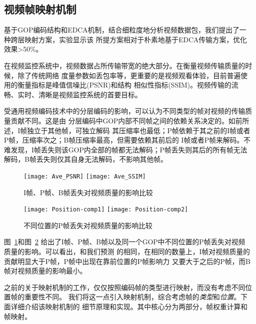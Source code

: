 \subsection{视频帧映射机制}
基于GOP编码结构和EDCA机制，结合细粒度地分析视频数据包，我们提出了一种跨层映射方案，实验显示该
所提方案相对于朴素地基于EDCA传输方案，优化效果>50\%。

在视频监控系统中，视频数据占所传输带宽的绝大部分。在衡量视频传输质量的时候，除了传统网络
度量参数如丢包率等，更重要的是视频观看体验，目前普遍使用的衡量指标是峰值信噪比(PSNR)和结构
相似性指标(SSIM)。视频传输的流畅、实时、清晰是视频监控系统的首要目标。

受通用视频编码技术中的分层编码的影响，可以认为不同类型的帧对视频的传输质量贡献不同。这是由
分层编码中GOP内部不同帧之间的依赖关系决定的。如前所述，I帧独立于其他帧，可独立解码
其压缩率也最低；P帧依赖于其之前的I帧或者P帧，压缩率次之；B帧压缩率最高，但需要依赖其前后的
I帧或者P帧来解码。不难发现，I帧丢失则该GOP内全部的帧都无法解码；P帧丢失则其后的所有帧无法
解码，B帧丢失则仅其自身无法解码，不影响其他帧。

\begin{figure}[h]
  \centering
  \subcaptionbox{}
      {\texttt{[image: Ave\_PSNR]}}
  \hspace{1em}
  \subcaptionbox{}
    {\texttt{[image: Ave\_SSIM]}}
  \caption{I帧、P帧、B帧丢失对视频质量的影响比较}
  \label{fig:ipb-comp}
\end{figure}

\begin{figure}[h]
  \centering
  \subcaptionbox{}
      {\texttt{[image: Position-comp1]}}
  \hspace{1em}
  \subcaptionbox{}
    {\texttt{[image: Position-comp2]}}
  \caption{不同位置的P帧丢失对视频质量的影响比较}
  \label{fig:position-comp}
\end{figure}

图~\ref{fig:ipb-comp}和图~\ref{fig:position-comp}
给出了I帧、P帧、B帧以及同一个GOP中不同位置的P帧丢失对视频质量的影响。可以看出，和我们预测
的相同，在相同的数量上，I帧对视频质量的贡献明显大于P帧，P帧中出现在靠前位置的P帧影响力
又要大于之后的P帧，而B帧对视频质量的影响最小。

之前的关于映射机制的工作，仅仅按照编码帧的类型进行映射，而没有考虑不同位置帧的重要性不同。
我们将这一点引入映射机制，综合考虑帧的\emph{类型}和\emph{位置}。下面详细介绍该映射机制的
细节原理和实现。其中核心分为两部分，帧权重计算和帧映射。

